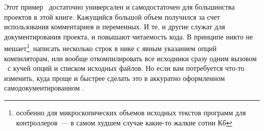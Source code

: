 
\bigskip


\bigskip
Этот пример \makefile\ достаточно универсален и самодостаточен для большинства
проектов в этой книге. Кажущийся большой объем получился за счет использования
комментариев и переменных. И те, и другие служат для документирования проекта,
и повышают читаемость кода. В принципе никто не мешает\footnote{особенно для
микроскопических объемов исходных текстов программ для контроллеров\ ---
в самом худшем случае какие-то жалкие сотни Кб}\ написать несколько строк в
нике с явным указанием опций компиляторам, или вообще откомпилировать
все исходники сразу одним вызовом \ с кучей опций и списком исходных
файлов. Но если вам потребуется что-то изменить, куда проще и быстрее сделать
это в аккуратно оформленном самодокументированном \makefile.

